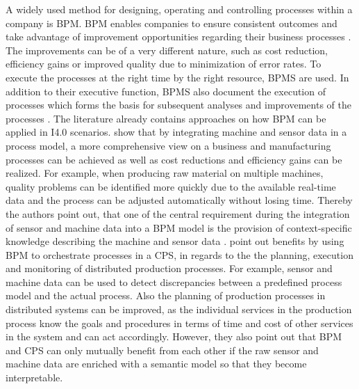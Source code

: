A widely used method for designing, operating and controlling processes within a company is \ac{BPM}. \ac{BPM} enables companies to ensure consistent outcomes and take advantage of improvement opportunities regarding their business processes \cite[p. 1]{Dumas2018FundamentalManagement}. The improvements can be of a very different nature, such as cost reduction, efficiency gains or improved quality due to minimization of error rates. To execute the processes at the right time by the right resource, \ac{BPMS} are used. In addition to their executive function, \ac{BPMS} also document the execution of processes which forms the basis for subsequent analyses and improvements of the processes \cite[p. 345]{Dumas2018FundamentalManagement}. The literature already contains approaches on how BPM can be applied in \ac{I4.0} scenarios. \citet[p. 1444]{Schonig2020IoTExecution} show that by integrating machine and sensor data in a process model, a more comprehensive view on a business and manufacturing processes can be achieved as well as cost reductions and efficiency gains can be realized. For example, when producing raw material on multiple machines, quality problems can be identified more quickly due to the available real-time data and the process can be adjusted  automatically without losing time. Thereby the authors point out, that one of the central requirement during the integration of sensor and machine data into a \ac{BPM} model is the provision of context-specific knowledge describing the machine and sensor data \cite[p. 1447]{Schonig2020IoTExecution}. \citet[p. 2]{Jaenisch2017TheChallenges} point out benefits by using \ac{BPM} to orchestrate processes in a \ac{CPS}, in regards to the the planning, execution and monitoring of distributed production processes. For example, sensor and machine data can be used to detect discrepancies between a predefined process model and the actual process. Also the planning of production processes in distributed systems can be improved, as the individual services in the production process know the goals and procedures in terms of time and cost of other services in the system and can act accordingly. However, they also point out that \ac{BPM} and \ac{CPS} can only mutually benefit from each other if the raw sensor and machine data are enriched with a semantic model so that they become interpretable.    

